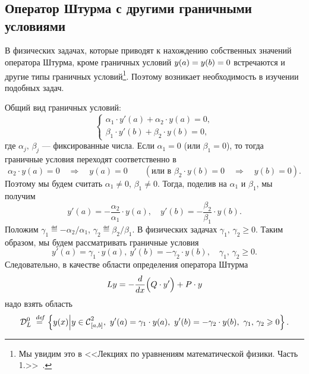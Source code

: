 \chapter{}
\label{lecture7}
\section{Оператор Штурма с другими граничными условиями}
\label{lecture7section1}
В физических задачах, которые приводят к нахождению собственных значений оператора Штурма, кроме граничных условий $y(a)\?=y(b)=0$ встречаются и другие типы граничных условий\footnote[1]{Мы увидим это в <<Лекциях по уравнениям математической физики. Часть 1.>>~\cite{mathphys}.}. Поэтому возникает необходимость в изучении подобных задач.

Общий вид граничных условий:
\begin{equation*}
	\begin{cases}
		\alpha_1\cdot y'(a)+\alpha_2\cdot y(a)=0,\\
		\beta_1\cdot y'(b)+\beta_2\cdot y(b)=0,
	\end{cases}
\end{equation*} 
где $\alpha_j,\,\beta_j$ --- фиксированные числа. Если $\alpha_1=0$ (или $\beta_1=0$), то тогда граничные условия переходят соответственно в
\begin{equation*}
	\alpha_2\cdot y(a)=0\quad\Rightarrow\quad y(a)=0\qquad(\text{или в }\beta_2\cdot y(b)=0\quad\Rightarrow\quad y(b)=0).
\end{equation*}  
Поэтому мы будем считать $\alpha_1\neq0$, $\beta_1\neq0$. Тогда{\mb,} поделив на $\alpha_1$ и $\beta_1${\mb,} мы получим
\begin{equation*}
	 y'(a)=-\frac{\alpha_2}{\alpha_1}\cdot y(a),\quad y'(b)=-\frac{\beta_2}{\beta_1}\cdot y(b).
\end{equation*}
Положим $\gamma_1\eqdef-\alpha_2/\alpha_1$, $\gamma_2\eqdef\beta_2/\beta_1$. В физических задачах $\gamma_1,\,\gamma_2\geqslant0$. Таким образом{\mb,} мы будем рассматривать граничные условия 
\begin{equation}
	\label{l7:eq:1}
	 y'(a)=\gamma_1\cdot y(a),\  y'(b)=-\gamma_2\cdot y(b),\quad\gamma_1,\,\gamma_2\geqslant0.
\end{equation} 
Следовательно{\mb,} в качестве области определения оператора Штурма 
\begin{equation*}
	 Ly=-\frac{d}{dx}\Big(Q\cdot y'\Big)+P\cdot y
\end{equation*}
надо взять область
\begin{equation*}
	\mc{D}_{L}^0\eqdef\left\{y(x)\middle|y\in\Cfn[{[a,b]}]{2},\ y'(a)=\gamma_1\cdot y(a),\ y'(b)=-\gamma_2\cdot y(b),\ \gamma_1,\,\gamma_2\geqslant0\right\}.
\end{equation*}
